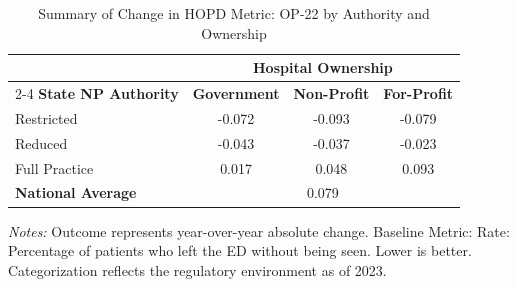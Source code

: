 \begin{table}[htbp]
    \centering
    \caption{Summary of Change in HOPD Metric: OP-22 by Authority and Ownership}
    \label{tab:d_hopd_op_22_own}
    \vspace{0.2cm}
    \begin{tabular}{lccc}
        \toprule
        & \multicolumn{3}{c}{\textbf{Hospital Ownership}} \\
        \cmidrule(lr){2-4}
        \textbf{State NP Authority} & \textbf{Government} & \textbf{Non-Profit} & \textbf{For-Profit} \\
        \midrule
        Restricted & -0.072 & -0.093 & -0.079 \\
        Reduced & -0.043 & -0.037 & -0.023 \\
        Full Practice & 0.017 & 0.048 & 0.093 \\
        \midrule
        \textbf{National Average} & \multicolumn{3}{c}{0.079} \\
        \bottomrule
    \end{tabular}
    \vspace{0.1cm}
    \begin{minipage}{0.85\textwidth}
        \footnotesize \textit{Notes:} Outcome represents year-over-year absolute change. Baseline Metric: Rate: Percentage of patients who left the ED without being seen. Lower is better. Categorization reflects the regulatory environment as of 2023.
    \end{minipage}
\end{table}